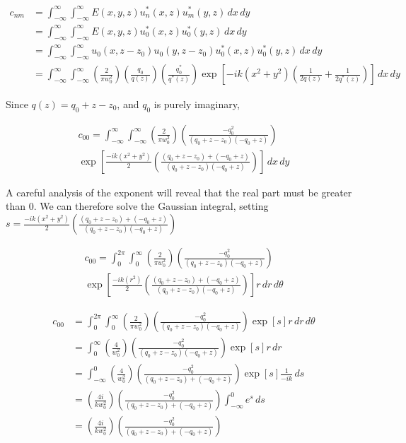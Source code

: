 \newcommand{\intinfxy}[1]{\int^{\infty}_{- \infty} \int^{\infty}_{- \infty} #1 \,dx \,dy}
\newcommand{\intinfrt}[1]{\int^{2 \pi}_{0} \int^{\infty}_{0} #1 r \,dr \,d\theta}


\begin{align}
    c_{nm} &= \intinfxy{
    E(x,y,z) u_n^*(x,z)u_m^*(y,z)}
\\  &= \intinfxy{
    E(x,y,z) u_0^*(x,z)u_0^*(y,z)}
\\  &= \intinfxy{
    u_0(x,z-z_0)u_0(y,z-z_0) u_0^*(x,z)u_0^*(y,z)}
\\  &= \intinfxy{ \left( \frac{2}{\pi w^2_0} \right) \left( \frac{q_0}{q(z)} \right)
    \left( \frac{q^*_0}{q^*(z)} \right) \exp \left[-ik \left( x^2 + y^2  \right)
    \left( \frac{1}{2q(z)} + \frac{1}{2q^*(z)} \right) \right]}
\end{align}

Since $q(z) = q_0 + z - z_0$, and $q_0$ is purely imaginary,


\begin{multline}
    c_{00} = \intinfxy{ \left( \frac{2}{\pi w^2_0} \right)
    \left( \frac{-q^2_0}{(q_0+z-z_0)(-q_0+z)} \right) \\
    \exp \left[
    \frac{-ik \left( x^2 + y^2  \right)}{2} \left( \frac{(q_0+z-z_0)+(-q_0+z)}{(q_0+z-z_0)(-q_0+z)} \right)
    \right]}
\end{multline}

A careful analysis of the exponent will reveal that the real part must be greater than $0$.
We can therefore solve the Gaussian integral, setting $s = \frac{-ik \left( x^2 + y^2
\right)}{2} \left( \frac{(q_0+z-z_0)+(-q_0+z)}{(q_0+z-z_0)(-q_0+z)} \right)$

\begin{multline}
    c_{00} = \intinfrt{ \left( \frac{2}{\pi w^2_0} \right)
    \left( \frac{-q^2_0}{(q_0+z-z_0)(-q_0+z)} \right) \\
    \exp \left[
    \frac{-ik \left( r^2  \right)}{2} \left( \frac{(q_0+z-z_0)+(-q_0+z)}{(q_0+z-z_0)(-q_0+z)} \right)
    \right]}
\end{multline}

\begin{align}
    c_{00} &= \intinfrt{ \left( \frac{2}{\pi w^2_0} \right)
    \left( \frac{-q^2_0}{(q_0+z-z_0)(-q_0+z)} \right)
    \exp \left[
    s
    \right]}
\\  &= \int^{\infty}_{0} \left( \frac{4}{w^2_0} \right)
    \left( \frac{-q^2_0}{(q_0+z-z_0)(-q_0+z)} \right)
    \exp \left[
    s
    \right] r \,dr
\\  &= \int^{0}_{-\infty} \left( \frac{4}{w^2_0} \right)
    \left( \frac{-q^2_0}{(q_0+z-z_0)+(-q_0+z)} \right)
    \exp \left[ s
    \right] \frac{1}{-ik} \,ds
\\  &= \left( \frac{4i}{kw^2_0} \right)
    \left( \frac{-q^2_0}{(q_0+z-z_0)+(-q_0+z)} \right)
    \int^0_{-\infty} e^s \,ds
\\  &= \left( \frac{4i}{kw^2_0} \right)
    \left( \frac{-q^2_0}{(q_0+z-z_0)+(-q_0+z)} \right)
\end{align}



